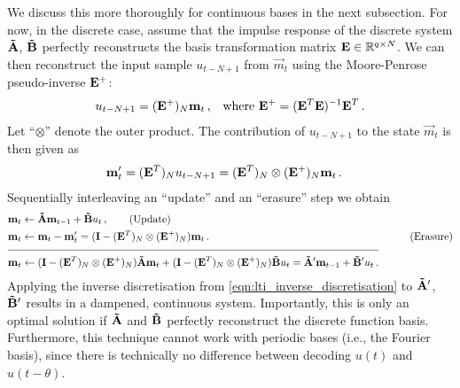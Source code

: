 We discuss this more thoroughly for continuous bases in the next subsection.
For now, in the discrete case, assume that the impulse response of the discrete \LTI system $\mathbf{\tilde A}$, $\mathbf{\tilde B}$ perfectly reconstructs the basis transformation matrix $\mathbf{E} \in \mathbb{R}^{q \times N}$.
We can then reconstruct the input sample $u_{t - N + 1}$ from $\vec m_t$ using the Moore-Penrose pseudo-inverse $\mathbf{E}^+$:
\begin{align*}
	u_{t - N + 1} &= (\mathbf{E}^+)_{N} \mathbf{m}_t \,, & \text{where } \mathbf{E}^+ = (\mathbf{E}^T \mathbf{E})^{-1} \mathbf{E}^T\,.
\end{align*}
Let \enquote{$\otimes$} denote the outer product.
The contribution of $u_{t - N + 1}$ to the state $\vec m_t$ is then given as
\begin{align*}
 	\mathbf{m}'_t &= ( \mathbf{E}^T)_N u_{t - N + 1} = ( \mathbf{E}^T)_N \otimes (\mathbf{E}^+)_N\mathbf{m}_t \,.
\end{align*}
Sequentially interleaving an \enquote{update} and an \enquote{erasure} step we obtain
\begin{align}
 	\vec m_t &\gets \mat{\tilde A} \vec m_{t - 1} + \mat{\tilde B} u_t \,, \tag{Update}\\
 	\vec m_t &\gets \vec m_t - \vec m'_t = ( \mat I - ( \mat E^T )_N \otimes (\mat E^+)_N ) \vec m_t \,. & \tag{Erasure}\\[-0.5em]
 	\cline{1-2}
 	\vec m_t &\gets
 		(\mat I - ( \mat E^T )_N \otimes (\mat E^+)_N ) \mat{\tilde A} \vec m_t
 		+ (\mat I - ( \mat E^T )_N \otimes (\mat E^+ )_N ) \mat{\tilde B} u_t
 		=   \mat{{\tilde A}'} \vec m_{t - 1} + \mat{{\tilde B}'} u_t  \,.
	\label{eqn:information_erasure_discrete}
\end{align}
Applying the inverse discretisation from \cref{eqn:lti_inverse_discretisation} to $\mathbf{\tilde A}'$, $\mathbf{\tilde B}'$ results in a dampened, continuous \LTI system.
Importantly, this is only an optimal solution if $\mathbf{\tilde A}$ and $\mathbf{\tilde B}$ perfectly reconstruct the discrete function basis.
Furthermore, this technique cannot work with periodic bases (i.e., the Fourier basis), since there is technically no difference between decoding $u(t)$ and $u(t - \theta)$.

